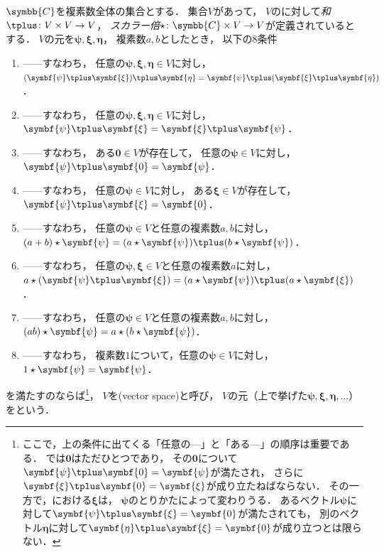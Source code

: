\documentclass[
]{sotsu}
\newcommand{\bpsi}{\symbf{\psi}}
\newcommand{\bxi}{\symbf{\xi}}
\newcommand{\beeta}{\symbf{\eta}}
\newcommand{\fire}[1]{\textcolor{fire}{#1}}
\newcommand{\water}[1]{\textcolor{water}{#1}}
\begin{document}
$\symbb{C}$を複素数全体の集合とする．
集合$V$があって，
$V$のに対して\emph{和}$\vecplus \colon V \times V \to V$，
\emph{スカラー倍}$\scaprod \colon \symbb{C} \times V \to V$が定義されているとする．
$V$の元を$\bpsi, \bxi, \beeta$，
複素数$a, b$としたとき，
以下の8条件
\begin{enumerate}
    \item \label{vector:sum-associative}
        ------すなわち，
        \fire{任意の$\bpsi, \bxi, \beeta \in V$}に対し，
        $(\bpsi \vecplus \bxi) \vecplus \beeta = \bpsi \vecplus (\bxi \vecplus \beeta)$．
    \item \label{vector:sum-commutative}
        ------すなわち，
        \fire{任意の$\bpsi, \bxi, \beeta \in V$}に対し，
        $\bpsi \vecplus \bxi = \bxi \vecplus \bpsi$．
    \item \label{vector:sum-zero}
        ------すなわち，
        \water{ある$\symbf{0} \in V$}が存在して，
        \fire{任意の$\bpsi \in V$}に対し，$\bpsi \vecplus \symbf{0} = \bpsi$．
    \item \label{vector:sum-opposite}
        ------すなわち，
        \fire{任意の$\bpsi \in V$}に対し，
        \water{ある$\bxi \in V$}が存在して，
        $\bpsi \vecplus \bxi = \symbf{0}$．
    \item \label{vector:scalar-sum}
        ------すなわち，
        \fire{任意の$\bpsi \in V$}と\fire{任意の複素数$a, b$}に対し，
        $(a + b) \scaprod \bpsi = (a \scaprod \bpsi) \vecplus (b \scaprod \bpsi)$．
    \item \label{vector:scalar-distributive}
        ------すなわち，
        \fire{任意の$\bpsi, \bxi \in V$}と\fire{任意の複素数$a$}に対し，
        $a \scaprod (\bpsi \vecplus \bxi) = (a \scaprod \bpsi) \vecplus (a \scaprod \bxi)$．
    \item \label{vector:scalar-prod}
        ------すなわち，
        \fire{任意の$\bpsi \in V$}と\fire{任意の複素数$a, b$}に対し，
        $(ab) \scaprod \bpsi = a \scaprod (b \scaprod \bpsi)$．
    \item \label{vector:scalar-identity}
        ------すなわち，
        複素数$1$について，\fire{任意の$\bpsi \in V$}に対し，
        $1 \scaprod \bpsi = \bpsi$．
\end{enumerate}
を満たすのならば\footnote{
    ここで，上の条件に出てくる「\fire{任意の}---」と「\water{ある}---」の順序は重要である．
    では$\symbf{0}$はただひとつであり，
    その$\symbf{0}$について$\bpsi \vecplus \symbf{0} = \bpsi$が満たされ，
    さらに$\bxi \vecplus \symbf{0} = \bxi$が成り立たねばならない．
    その一方で，における$\bxi$は，
    $\bpsi$のとりかたによって変わりうる．
    あるベクトル$\bpsi$に対して$\bpsi \vecplus \bxi = \symbf{0}$が満たされても，
    別のベクトル$\beeta$に対して$\beeta \vecplus \bxi = \symbf{0}$が成り立つとは限らない．
}，
$V$を(vector space)と呼び，
$V$の元（上で挙げた$\bpsi, \bxi, \beeta, \dotsc$）をという．
\end{document}
